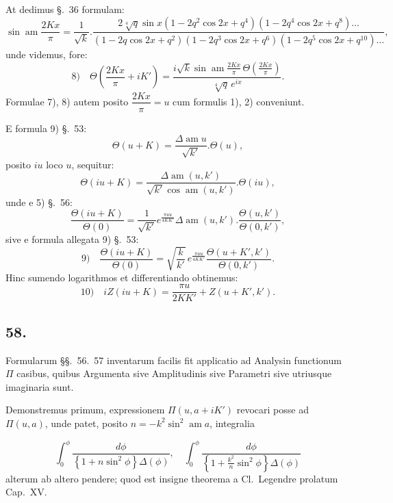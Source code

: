 \documentclass{article}
\begin{document}
At dedimus §.\ 36 formulam:
\[
\sin\operatorname{am}\frac{2Kx}{\pi}=\frac{1}{\sqrt{k}}.\frac{2\sqrt[4]{q}\sin x(1-2q^{2}\cos2x+q^{4})(1-2q^{4}\cos2x+q^{8})\ldots}{(1-2q\cos2x+q^{2})(1-2q^{3}\cos2x+q^{6})(1-2q^{5}\cos2x+q^{10})\ldots},
\]
unde videmus, fore:
\[
\text{8)}\quad \Theta\left(\frac{2Kx}{\pi}+iK'\right)=\frac{i\sqrt{k}\sin\operatorname{am}\frac{2Kx}{\pi}\,\Theta\left(\frac{2Kx}{\pi}\right)}{\sqrt[4]{q}\,e^{ix}}.
\]
Formulae 7), 8) autem posito $\dfrac{2Kx}{\pi}=u$ cum formulis 1), 2) conveniunt.

E formula 9) §.\ 53:
\[
\Theta(u+K)=\frac{\Delta\operatorname{am}u}{\sqrt{k'}}.\Theta(u),
\]
posito $iu$ loco $u$, sequitur:
\[
\Theta(iu+K)=\frac{\Delta\operatorname{am}(u,k')}{\sqrt{k'}\cos\operatorname{am}(u,k')}.\Theta(iu),
\]
unde e 5) §.\ 56:
\[
\frac{\Theta(iu+K)}{\Theta(0)}=\frac{1}{\sqrt{k'}}e^{\frac{\pi uu}{4KK'}}\Delta\operatorname{am}(u,k').\frac{\Theta(u,k')}{\Theta(0,k')},
\]
sive e formula allegata 9) §.\ 53:
\[
\text{9)}\quad \frac{\Theta(iu+K)}{\Theta(0)}=\sqrt{\frac{k}{k'}}\,e^{\frac{\pi uu}{4KK'}}\frac{\Theta(u+K',k')}{\Theta(0,k')}.
\]
Hinc sumendo logarithmos et differentiando obtinemus:
\[
\text{10)}\quad iZ(iu+K)=\frac{\pi u}{2KK'}+Z(u+K',k').
\]

\subsection*{58.}

Formularum §§.\ 56.\ 57 inventarum facilis fit applicatio ad Analysin functionum $\Pi$ casibus, quibus Argumenta sive Amplitudinis sive Parametri sive utriusque imaginaria sunt.

Demonstremus primum, expressionem $\Pi(u,a+iK')$ revocari posse ad $\Pi(u,a)$, unde patet, posito $n=-k^{2}\sin^{2}\operatorname{am}a$, integralia

\[
\int_{0}^{\phi}\frac{d\phi}{\left\{1+n\sin^{2}\phi\right\}\Delta(\phi)},\quad \int_{0}^{\phi}\frac{d\phi}{\left\{1+\frac{k^{2}}{n}\sin^{2}\phi\right\}\Delta(\phi)}
\]
alterum ab altero pendere; quod est insigne theorema a Cl.\ Legendre prolatum Cap.\ XV.
\end{document}
